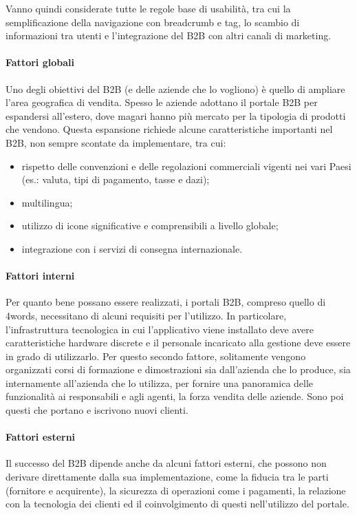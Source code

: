 Vanno quindi considerate tutte le regole base di usabilità, tra cui la semplificazione della navigazione con \gls{breadcrumb} e \gls{tag}, lo scambio di informazioni tra utenti e l'integrazione del B2B con altri canali di marketing.

\paragraph{Fattori globali}
Uno degli obiettivi del B2B (e delle aziende che lo vogliono) è quello di ampliare l'area geografica di vendita. Spesso le aziende adottano il portale B2B per espandersi all'estero, dove magari hanno più mercato per la tipologia di prodotti che vendono. Questa espansione richiede alcune caratteristiche importanti nel B2B, non sempre scontate da implementare, tra cui:
\begin{itemize}
	\item rispetto delle convenzioni e delle regolazioni commerciali vigenti nei vari Paesi (es.: valuta, tipi di pagamento, tasse e dazi);
	\item multilingua;
	\item utilizzo di icone significative e comprensibili a livello globale;
	\item integrazione con i servizi di consegna internazionale.
\end{itemize}

\paragraph{Fattori interni}
Per quanto bene possano essere realizzati, i portali B2B, compreso quello di 4words, necessitano di alcuni requisiti per l'utilizzo. In particolare, l'infrastruttura tecnologica in cui l'applicativo viene installato deve avere caratteristiche hardware discrete e il personale incaricato alla gestione deve essere in grado di utilizzarlo. Per questo secondo fattore, solitamente vengono organizzati corsi di formazione e dimostrazioni sia dall'azienda che lo produce, sia internamente all'azienda che lo utilizza, per fornire una panoramica delle funzionalità ai responsabili e agli agenti, la forza vendita delle aziende. Sono poi questi che portano e iscrivono nuovi clienti.

\paragraph{Fattori esterni}
Il successo del B2B dipende anche da alcuni fattori esterni, che possono non derivare direttamente dalla sua implementazione, come la fiducia tra le parti (fornitore e acquirente), la sicurezza di operazioni come i pagamenti, la relazione con la tecnologia dei clienti ed il coinvolgimento di questi nell'utilizzo del portale.


